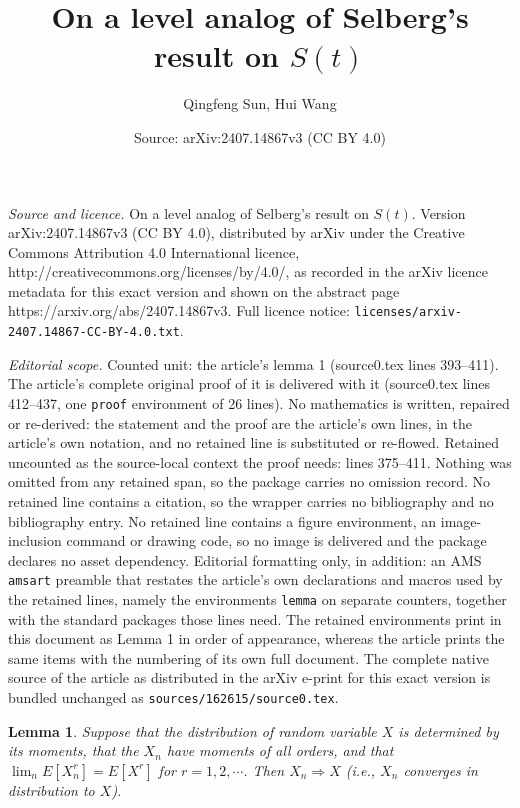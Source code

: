 \documentclass[10pt,a4paper]{amsart}
\title{On a level analog of Selberg's result on $S(t)$}
\author{Qingfeng Sun, Hui Wang}
\date{Source: arXiv:2407.14867v3 (CC BY 4.0)}
\newtheorem{lemma}{Lemma}
\begin{document}
\maketitle

\noindent\emph{Source and licence.} On a level analog of Selberg's result on $S(t)$. Version arXiv:2407.14867v3 (CC BY 4.0), distributed by arXiv under the Creative Commons Attribution 4.0 International licence, http://creativecommons.org/licenses/by/4.0/, as recorded in the arXiv licence metadata for this exact version and shown on the abstract page https://arxiv.org/abs/2407.14867v3. Full licence notice: \texttt{licenses/arxiv-2407.14867-CC-BY-4.0.txt}.\par\smallskip

\noindent\textit{Editorial scope.} Counted unit: the article's lemma 1 (source0.tex lines 393--411). The article's complete original proof of it is delivered with it (source0.tex lines 412--437, one \texttt{proof} environment of 26 lines). No mathematics is written, repaired or re-derived: the statement and the proof are the article's own lines, in the article's own notation, and no retained line is substituted or re-flowed.  Retained uncounted as the source-local context the proof needs: lines 375--411.  Nothing was omitted from any retained span, so the package carries no omission record.  No retained line contains a citation, so the wrapper carries no bibliography and no bibliography entry.  No retained line contains a figure environment, an image-inclusion command or drawing code, so no image is delivered and the package declares no asset dependency.  Editorial formatting only, in addition: an AMS \texttt{amsart} preamble that restates the article's own declarations and macros used by the retained lines, namely the environments \texttt{lemma} on separate counters, together with the standard packages those lines need.  The retained environments print in this document as Lemma 1 in order of appearance, whereas the article prints the same items with the numbering of its own full document.  The complete native source of the article as distributed in the arXiv e-print for this exact version is bundled unchanged as \texttt{sources/162615/source0.tex}.
\begin{lemma}\label{probability theory}
Suppose that the distribution of random variable $X$ is determined by its moments, that the $X_n$ have moments of all orders, and that
$\lim_n E[X_n^r]=E[X^r]$ for $r=1,2,\cdots$. Then $X_n\Rightarrow X$ (i.e., $X_n$ converges in distribution to $X$).
\end{lemma}
\end{document}
